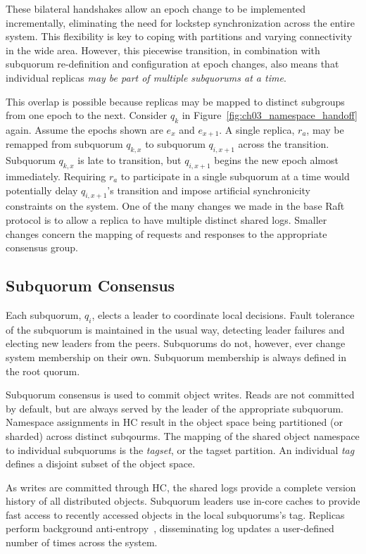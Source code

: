 These bilateral handshakes allow an epoch change to be implemented incrementally, eliminating the need for lockstep synchronization across the entire system.
This flexibility is key to coping with partitions and varying connectivity in the wide area.
However, this piecewise transition, in combination with subquorum re-definition and configuration at epoch changes, also means that individual replicas \emph{may be part of multiple subquorums at a time}.

This overlap is possible because replicas may be mapped to distinct subgroups from one epoch to the next.
Consider $q_k$ in Figure~\ref{fig:ch03_namespace_handoff} again.
Assume the epochs shown are $e_x$ and $e_{x+1}$.
A single replica, $r_a$, may be remapped from subquorum $q_{k,x}$ to subquorum $q_{i,x+1}$ across the transition.
Subquorum $q_{k,x}$ is late to transition, but $q_{i,x+1}$ begins the new epoch almost immediately.
Requiring $r_a$ to participate in a single subquorum at a time would potentially delay $q_{i,x+1}$'s transition and impose artificial synchronicity constraints on the system.
One of the many changes we made in the base Raft protocol is to allow a replica to have multiple distinct shared logs.
Smaller changes concern the mapping of requests and responses to the appropriate consensus group.

\subsection{Subquorum Consensus}
\label{ch03_subquorum_consensus}


Each subquorum, $q_i$, elects a leader to coordinate local decisions.
Fault tolerance of the subquorum is maintained in the usual way, detecting leader failures and electing new leaders from the peers.
Subquorums do not, however, ever change system membership on their own.
Subquorum membership is always defined in the root quorum.

Subquorum consensus is used to commit object writes.
Reads are not committed by default, but are always served by the leader of the
appropriate subquorum.
Namespace assignments in HC result in the object space being partitioned (or
sharded) across distinct subqourms.
The mapping of the shared object namespace to individual subquorums is the
\emph{tagset}, or the tagset partition.
An individual \emph{tag} defines a disjoint subset of the object space.

As writes are committed through HC, the shared logs provide a complete version history of all distributed objects.
Subquorum leaders use in-core caches to provide fast access to recently accessed objects in the local subquorums's tag.
Replicas perform background anti-entropy~\cite{dynamo,bayou,anti_entropy}, disseminating log updates a user-defined number of times across the system.

